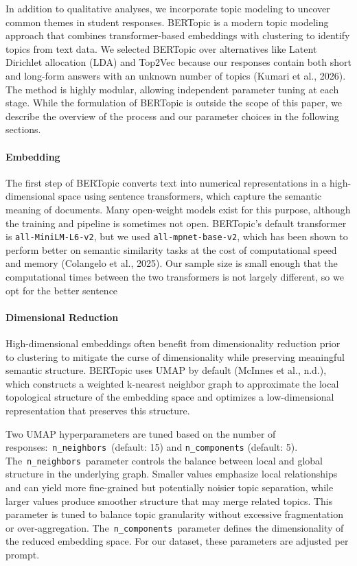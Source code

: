 \documentclass[phd]{nuthesis}
\begin{document}
In addition to qualitative analyses, we incorporate topic modeling to
uncover common themes in student responses. BERTopic is a modern topic
modeling approach that combines transformer-based embeddings with
clustering to identify topics from text data. We selected BERTopic over
alternatives like Latent Dirichlet allocation (LDA) and Top2Vec because
our responses contain both short and long-form answers with an unknown
number of topics (Kumari et al., 2026). The method is highly modular,
allowing independent parameter tuning at each stage. While the
formulation of BERTopic is outside the scope of this paper, we describe
the overview of the process and our parameter choices in the following
sections.

\paragraph{Embedding}\label{embedding}

The first step of BERTopic converts text into numerical representations
in a high-dimensional space using sentence transformers, which capture
the semantic meaning of documents. Many open-weight models exist for
this purpose, although the training and pipeline is sometimes not open.
BERTopic's default transformer is \texttt{all-MiniLM-L6-v2}, but we used
\texttt{all-mpnet-base-v2}, which has been shown to perform better on
semantic similarity tasks at the cost of computational speed and memory
(Colangelo et al., 2025). Our sample size is small enough that the
computational times between the two transformers is not largely
different, so we opt for the better sentence

\paragraph{Dimensional Reduction}\label{dimensional-reduction}

High-dimensional embeddings often benefit from dimensionality reduction
prior to clustering to mitigate the curse of dimensionality while
preserving meaningful semantic structure. BERTopic uses UMAP by default
(McInnes et al., n.d.), which constructs a weighted k-nearest neighbor
graph to approximate the local topological structure of the embedding
space and optimizes a low-dimensional representation that preserves this
structure.

Two UMAP hyperparameters are tuned based on the number of
responses:~\texttt{n\_neighbors}~(default: 15) and
\texttt{n\_components} (default: 5). The~\texttt{n\_neighbors}~parameter
controls the balance between local and global structure in the
underlying graph. Smaller values emphasize local relationships and can
yield more fine-grained but potentially noisier topic separation, while
larger values produce smoother structure that may merge related topics.
This parameter is tuned to balance topic granularity without excessive
fragmentation or over-aggregation. The~\texttt{n\_components}~parameter
defines the dimensionality of the reduced embedding space. For our
dataset, these parameters are adjusted per prompt.
\end{document}
